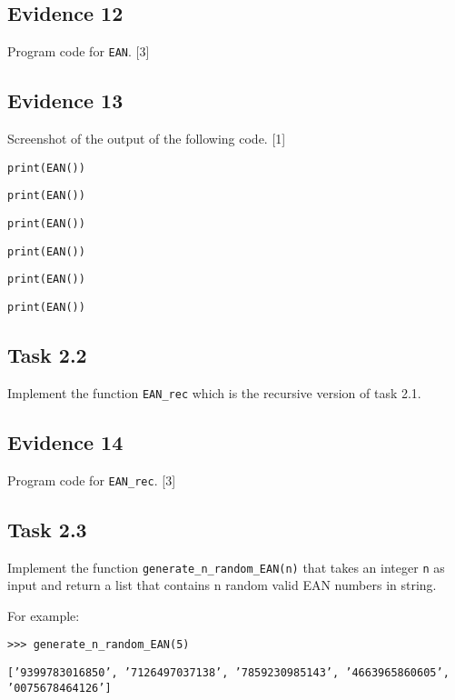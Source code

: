 \subsection*{Evidence 12 }

Program code for \texttt{EAN}. \hfill{} {[}3{]}

\subsection*{Evidence 13 }

Screenshot of the output of the following code. \hfill{} {[}1{]}

\noindent %
\noindent\begin{minipage}[t]{1\columnwidth}%
\texttt{print(EAN(\textquotedbl ))}

\texttt{print(EAN(\textquotedbl )) }

\texttt{print(EAN(\textquotedbl )) }

\texttt{print(EAN(\textquotedbl )) }

\texttt{print(EAN(\textquotedbl )) }

\texttt{print(EAN(\textquotedbl )) }%
\end{minipage}

\subsection*{Task 2.2}

Implement the function \texttt{EAN\_rec} which is the recursive version
of task 2.1. 

\subsection*{Evidence 14}

Program code for \texttt{EAN\_rec}. \hfill{}{[}3{]}

\subsection*{Task 2.3 }

Implement the function \texttt{generate\_n\_random\_EAN(n)} that takes
an integer \texttt{n} as input and return a list that contains n random
valid EAN numbers in string. 

For example: 

\noindent %
\noindent\begin{minipage}[t]{1\columnwidth}%
\texttt{>\textcompwordmark >\textcompwordmark > generate\_n\_random\_EAN(5)}

\texttt{{[}'9399783016850', '7126497037138', '7859230985143', '4663965860605',
'0075678464126'{]}}%
\end{minipage}


